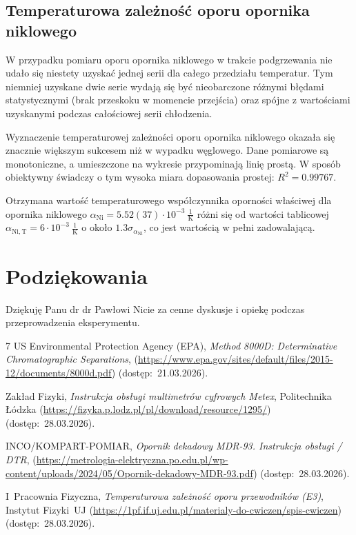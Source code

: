 \documentclass[twocolumn, a4paper, polish, 10pt]{article}
\begin{document}
\subsection{Temperaturowa zależność oporu opornika niklowego}
W przypadku pomiaru oporu opornika niklowego w trakcie podgrzewania nie udało się niestety uzyskać jednej serii dla całego przedziału temperatur. Tym niemniej uzyskane dwie serie wydają się być nieobarczone różnymi błędami statystycznymi (brak przeskoku w momencie przejścia) oraz spójne z wartościami uzyskanymi podczas całościowej serii chłodzenia.

Wyznaczenie temperaturowej zależności oporu opornika niklowego okazała się znacznie większym sukcesem niż w wypadku węglowego. Dane pomiarowe są monotoniczne, a umieszczone na wykresie przypominają linię prostą. W sposób obiektywny świadczy o tym wysoka miara dopasowania prostej: $R^2 = 0.99767$.

Otrzymana wartość temperaturowego współczynnika oporności właściwej dla opornika niklowego $\alpha_{\mathrm{Ni}} = 5.52(37) \cdot 10^{-3}~\frac{1}{ \mathrm{K} }$ różni się od wartości tablicowej $\alpha_{\mathrm{Ni, T}} = 6 \cdot 10^{-3}~\frac{1}{ \mathrm{K} }$ \cite{pracownia-fizyczna-e3} o około $1.3 \sigma_{ \alpha_{\mathrm{Ni}} }$, co jest wartością w pełni zadowalającą.

\section{Podziękowania}
Dziękuję Panu dr dr Pawłowi Nicie za cenne dyskusje i opiekę podczas przeprowadzenia eksperymentu.

\begin{thebibliography}{7}
     US Environmental Protection Agency (EPA), \emph{Method 8000D: Determinative Chromatographic Separations}, (\url{https://www.epa.gov/sites/default/files/2015-12/documents/8000d.pdf}) (dostęp:~21.03.2026).

     Zakład Fizyki, \emph{Instrukcja obsługi multimetrów cyfrowych Metex}, Politechnika Łódzka (\url{https://fizyka.p.lodz.pl/pl/download/resource/1295/}) (dostęp:~28.03.2026).

     INCO/KOMPART-POMIAR, \emph{Opornik dekadowy MDR-93. Instrukcja obsługi / DTR}, (\url{https://metrologia-elektryczna.po.edu.pl/wp-content/uploads/2024/05/Opornik-dekadowy-MDR-93.pdf}) (dostęp:~28.03.2026).
    
     I~Pracownia Fizyczna, \emph{Temperaturowa zależność oporu przewodników (E3)}, Instytut Fizyki~UJ (\url{https://1pf.if.uj.edu.pl/materialy-do-cwiczen/spis-cwiczen}) (dostęp:~28.03.2026).
\end{thebibliography}
\end{document}
